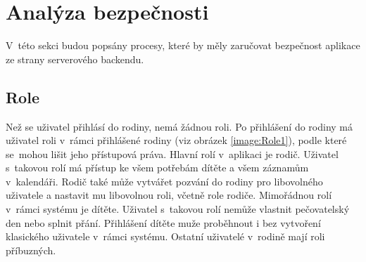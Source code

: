             
            
            

\section{Analýza bezpečnosti}
    V~této sekci budou popsány procesy, které by měly zaručovat bezpečnost aplikace ze strany serverového backendu.
    
    \subsection{Role}\label{analyza:bezpecnost:role}
    
        Než se uživatel přihlásí do rodiny, nemá žádnou roli. Po přihlášení do rodiny má uživatel roli v~rámci přihlášené rodiny (viz obrázek \ref{image:Role1}), podle které se~mohou lišit jeho přístupová práva. Hlavní rolí v~aplikaci je rodič. Uživatel s~takovou rolí má přístup ke všem potřebám dítěte a všem záznamům v~kalendáři. Rodič také může vytvářet pozvání do rodiny pro libovolného uživatele a nastavit mu libovolnou roli, včetně role rodiče. Mimořádnou rolí v~rámci systému je dítěte. 
        Uživatel s~takovou rolí nemůže vlastnit pečovatelský den nebo splnit přání. Přihlášení dítěte muže proběhnout i bez vytvoření klasického uživatele v~rámci systému. Ostatní uživatelé v~rodině mají roli příbuzných. 
    

